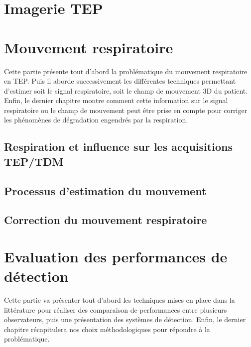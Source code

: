 \documentclass[12pt, twoside, a4paper]{book}
\begin{document}
 \listoffigures

 \listoftables

\newpage



\part{Imagerie TEP}
		
			
\part{Mouvement respiratoire}
Cette partie présente tout d'abord la problématique du mouvement respiratoire en TEP. Puis il aborde successivement les différentes techniques permettant d'estimer soit le signal respiratoire, soit le champ de mouvement 3D du patient. Enfin, le dernier chapitre montre comment cette information sur le signal respiratoire ou le champ de mouvement peut être prise en compte pour corriger les phénomènes de dégradation engendrés par la respiration.

	\chapter{Respiration et influence sur les acquisitions TEP/TDM}
	
	
	\chapter{Processus d'estimation du mouvement}
	
	
	\chapter{Correction du mouvement respiratoire}
	

\part{Evaluation des performances de détection}
Cette partie va présenter tout d'abord les techniques mises en place dans la littérature pour réaliser des comparaison de performances entre plusieurs observateurs, puis une présentation des systèmes de détection. Enfin, le dernier chapitre récapitulera nos choix méthodologiques pour répondre à la problématique.
\end{document}
